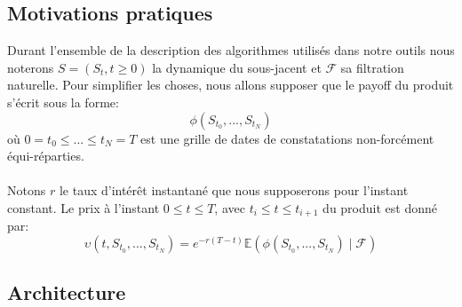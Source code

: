 \documentclass[french,12pt,a4paper]{article}
\begin{document}
\subsection{Motivations pratiques}
Durant l'ensemble de la description  des algorithmes utilisés dans notre outils nous noterons $S = (S_{t}, t \geq 0)$ la dynamique du sous-jacent et $\mathcal{F}$ sa filtration naturelle. Pour simplifier les choses, nous allons supposer que le payoff du produit s'écrit sous la forme:
$$\phi(S_{t_{0}},...,S_{t_{N}}) $$
où $0 = t_{0} \leq ... \leq t_{N} = T$ est une grille de dates de constatations non-forcément équi-réparties.\\\\
Notons $r$ le taux d'intérêt instantané que nous supposerons pour l'instant constant. Le prix à l'instant $0 \leq t \leq T$, avec $t_{i} \leq t \leq t_{i+1}$ du produit est donné par:
$$\upsilon(t, S_{t_{0}},...,S_{t_{N}}) = e^{-r(T-t)}\mathbb{E}(\phi(S_{t_{0}},...,S_{t_{N}})\mid\mathcal{F})$$

\subsection{Architecture}
\end{document}
